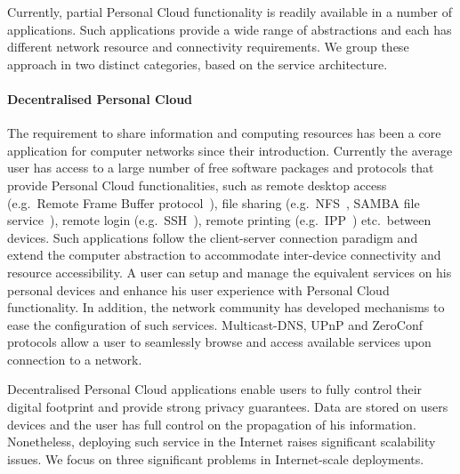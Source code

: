 Currently, partial Personal Cloud functionality is readily available in a number
of applications. Such applications provide a wide range of abstractions and each
has different network resource and connectivity requirements. We group these
approach in two distinct categories, based on the service architecture. 

\paragraph*{Decentralised Personal Cloud}

The requirement to share information and computing resources has been a core
application for computer networks since their introduction. Currently the
average user has access to a large number of free software packages and
protocols that provide Personal Cloud functionalities, such as remote desktop
access (e.g.~Remote Frame Buffer protocol~\cite{RFC6143}), file sharing
(e.g.~NFS~\cite{RFC3530}, SAMBA file service~\cite{samba}), remote login
(e.g.~SSH~\cite{RFC4253}), remote printing (e.g.~IPP~\cite{RFC2911}) etc.\
between devices. Such applications follow the client-server connection paradigm
and extend the computer abstraction to accommodate inter-device connectivity and
resource accessibility. A user can setup and manage the equivalent services on
his personal devices and enhance his user experience with Personal Cloud
functionality.  In addition, the network community has developed mechanisms to
ease the configuration of such services.  Multicast-DNS, UPnP and ZeroConf
protocols allow a user to seamlessly browse and access available services upon
connection to a network. 

Decentralised Personal Cloud applications enable users to fully control their
digital footprint and provide strong privacy guarantees. Data are stored on
users devices and the user has full control on the propagation of his
information.  Nonetheless, deploying such service in the Internet raises
significant scalability issues. We focus on three significant problems in
Internet-scale deployments. 

